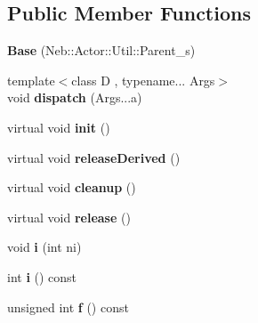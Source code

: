 \subsection*{\-Public \-Member \-Functions}
\begin{DoxyCompactItemize}
\item 
\hypertarget{classNeb_1_1Actor_1_1Base_a2148b7903d9aebf73bcb333240e8a5ac}{{\bfseries \-Base} (\-Neb\-::\-Actor\-::\-Util\-::\-Parent\-\_\-s)}\label{classNeb_1_1Actor_1_1Base_a2148b7903d9aebf73bcb333240e8a5ac}

\item 
\hypertarget{classNeb_1_1Actor_1_1Base_ad6c67af83640455001015816eedbfc0c}{{\footnotesize template$<$class D , typename... \-Args$>$ }\\void {\bfseries dispatch} (\-Args...\-a)}\label{classNeb_1_1Actor_1_1Base_ad6c67af83640455001015816eedbfc0c}

\item 
\hypertarget{classNeb_1_1Actor_1_1Base_aea161083c16227392cc4556928f5479e}{virtual void {\bfseries init} ()}\label{classNeb_1_1Actor_1_1Base_aea161083c16227392cc4556928f5479e}

\item 
\hypertarget{classNeb_1_1Actor_1_1Base_a6fcf7946643de0bdda7ef31b089ecd7a}{virtual void {\bfseries release\-Derived} ()}\label{classNeb_1_1Actor_1_1Base_a6fcf7946643de0bdda7ef31b089ecd7a}

\item 
\hypertarget{classNeb_1_1Actor_1_1Base_a4db2db31645b73484865f665e7b181e5}{virtual void {\bfseries cleanup} ()}\label{classNeb_1_1Actor_1_1Base_a4db2db31645b73484865f665e7b181e5}

\item 
\hypertarget{classNeb_1_1Actor_1_1Base_a19d7b3eeac560db781b8dd9d7a044bef}{virtual void {\bfseries release} ()}\label{classNeb_1_1Actor_1_1Base_a19d7b3eeac560db781b8dd9d7a044bef}

\item 
\hypertarget{classNeb_1_1Actor_1_1Base_a732e42c211856137d5fa55d041606805}{void {\bfseries i} (int ni)}\label{classNeb_1_1Actor_1_1Base_a732e42c211856137d5fa55d041606805}

\item 
\hypertarget{classNeb_1_1Actor_1_1Base_a8b8facad0502a876dec354116069fc00}{int {\bfseries i} () const }\label{classNeb_1_1Actor_1_1Base_a8b8facad0502a876dec354116069fc00}

\item 
\hypertarget{classNeb_1_1Actor_1_1Base_ab093290863fcedd9ef36828de4438401}{unsigned int {\bfseries f} () const }\label{classNeb_1_1Actor_1_1Base_ab093290863fcedd9ef36828de4438401}


\end{DoxyCompactItemize}
